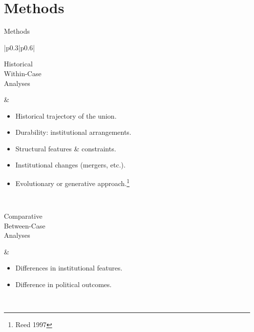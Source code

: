\documentclass{beamer}
\begin{document}
\section{Methods}
\begin{frame}{Methods}
\setlength{\arrayrulewidth}{0.0pt} %
\begin{tabular}{|p{0.3\textwidth}|p{0.6\textwidth}|}
\hline
\begin{minipage}[t][0.2\textheight][c]{\linewidth}
Historical\\
Within-Case\\
Analyses
\end{minipage}
&
\begin{itemize}
    \item Historical trajectory of the union.
    \item Durability: institutional arrangements.
    \item Structural features \& constraints.
    \item Institutional changes (mergers, etc.).
    \item Evolutionary or generative approach.\footnote{Reed 1997}
\end{itemize}
\\
\hline
\begin{minipage}[t][0.2\textheight][c]{\linewidth}
Comparative\\
Between-Case\\
Analyses
\end{minipage}
&
\begin{itemize}
    \item Differences in institutional features.
    \item Difference in political outcomes.
\end{itemize}
\\
\hline
\end{tabular}
\end{frame}
\end{document}
